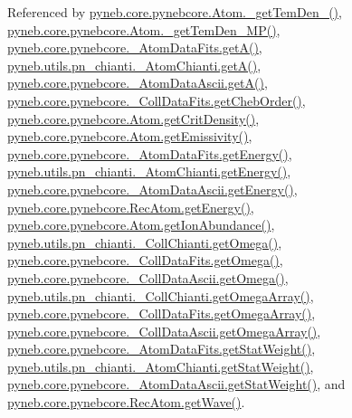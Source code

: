Referenced by \hyperlink{pynebcore_8py_source_l01803}{pyneb.\+core.\+pynebcore.\+Atom.\+\_\+get\+Tem\+Den\+\_()}, \hyperlink{pynebcore_8py_source_l01980}{pyneb.\+core.\+pynebcore.\+Atom.\+\_\+get\+Tem\+Den\+\_\+\+M\+P()}, \hyperlink{pynebcore_8py_source_l00205}{pyneb.\+core.\+pynebcore.\+\_\+\+Atom\+Data\+Fits.\+get\+A()}, \hyperlink{pn__chianti_8py_source_l00296}{pyneb.\+utils.\+pn\+\_\+chianti.\+\_\+\+Atom\+Chianti.\+get\+A()}, \hyperlink{pynebcore_8py_source_l00475}{pyneb.\+core.\+pynebcore.\+\_\+\+Atom\+Data\+Ascii.\+get\+A()}, \hyperlink{pynebcore_8py_source_l00694}{pyneb.\+core.\+pynebcore.\+\_\+\+Coll\+Data\+Fits.\+get\+Cheb\+Order()}, \hyperlink{pynebcore_8py_source_l01693}{pyneb.\+core.\+pynebcore.\+Atom.\+get\+Crit\+Density()}, \hyperlink{pynebcore_8py_source_l01716}{pyneb.\+core.\+pynebcore.\+Atom.\+get\+Emissivity()}, \hyperlink{pynebcore_8py_source_l00268}{pyneb.\+core.\+pynebcore.\+\_\+\+Atom\+Data\+Fits.\+get\+Energy()}, \hyperlink{pn__chianti_8py_source_l00346}{pyneb.\+utils.\+pn\+\_\+chianti.\+\_\+\+Atom\+Chianti.\+get\+Energy()}, \hyperlink{pynebcore_8py_source_l00525}{pyneb.\+core.\+pynebcore.\+\_\+\+Atom\+Data\+Ascii.\+get\+Energy()}, \hyperlink{pynebcore_8py_source_l02811}{pyneb.\+core.\+pynebcore.\+Rec\+Atom.\+get\+Energy()}, \hyperlink{pynebcore_8py_source_l02110}{pyneb.\+core.\+pynebcore.\+Atom.\+get\+Ion\+Abundance()}, \hyperlink{pn__chianti_8py_source_l00484}{pyneb.\+utils.\+pn\+\_\+chianti.\+\_\+\+Coll\+Chianti.\+get\+Omega()}, \hyperlink{pynebcore_8py_source_l00811}{pyneb.\+core.\+pynebcore.\+\_\+\+Coll\+Data\+Fits.\+get\+Omega()}, \hyperlink{pynebcore_8py_source_l01063}{pyneb.\+core.\+pynebcore.\+\_\+\+Coll\+Data\+Ascii.\+get\+Omega()}, \hyperlink{pn__chianti_8py_source_l00461}{pyneb.\+utils.\+pn\+\_\+chianti.\+\_\+\+Coll\+Chianti.\+get\+Omega\+Array()}, \hyperlink{pynebcore_8py_source_l00783}{pyneb.\+core.\+pynebcore.\+\_\+\+Coll\+Data\+Fits.\+get\+Omega\+Array()}, \hyperlink{pynebcore_8py_source_l01039}{pyneb.\+core.\+pynebcore.\+\_\+\+Coll\+Data\+Ascii.\+get\+Omega\+Array()}, \hyperlink{pynebcore_8py_source_l00242}{pyneb.\+core.\+pynebcore.\+\_\+\+Atom\+Data\+Fits.\+get\+Stat\+Weight()}, \hyperlink{pn__chianti_8py_source_l00323}{pyneb.\+utils.\+pn\+\_\+chianti.\+\_\+\+Atom\+Chianti.\+get\+Stat\+Weight()}, \hyperlink{pynebcore_8py_source_l00502}{pyneb.\+core.\+pynebcore.\+\_\+\+Atom\+Data\+Ascii.\+get\+Stat\+Weight()}, and \hyperlink{pynebcore_8py_source_l02623}{pyneb.\+core.\+pynebcore.\+Rec\+Atom.\+get\+Wave()}.


